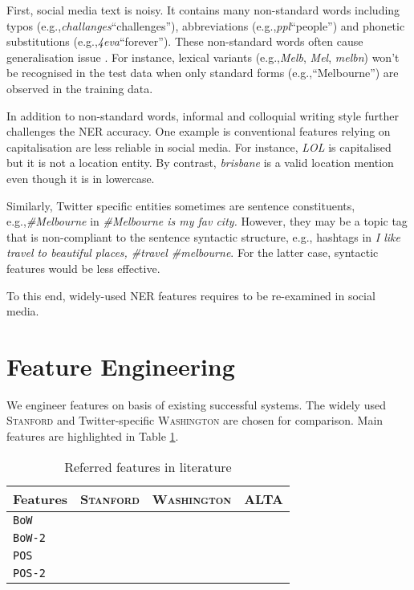 \documentclass[11pt]{article}
\newcommand{\eg}{e.g.,\xspace}
\newcommand{\mygl}[1]{``#1''}
\newcommand{\myex}[1]{\textit{#1}}
\newcommand{\lexpair}[2]{\myex{#1}\xspace\mygl{#2}}
\newcommand{\stanford}{\textsc{Stanford}\xspace}
\newcommand{\washington}{\textsc{Washington}\xspace}
\newcommand{\alta}{\textsc{ALTA}\xspace}
\newcommand{\feature}[1]{\texttt{#1}\xspace}
\newcommand{\tabref}[2][]{Table#1 \ref{#2}}
\newcommand{\cmark}{\ding{51}}%
\begin{document}
First, social media text is noisy.
It contains many non-standard words including typos (\eg \lexpair{challanges}{challenges}), abbreviations (\eg \lexpair{ppl}{people}) and phonetic substitutions (\eg \lexpair{4eva}{forever}).
These non-standard words often cause generalisation issue \cite{acl11han}.
For instance, lexical variants (\eg \myex{Melb}, \myex{Mel}, \myex{melbn}) won't be recognised in the test data when only standard forms (\eg \mygl{Melbourne}) are observed in the training data.

In addition to non-standard words, informal and colloquial writing style further challenges the NER accuracy.
One example is conventional features relying on capitalisation are less reliable in social media.
For instance, \myex{LOL} is capitalised but it is not a location entity.
By contrast, \myex{brisbane} is a valid location mention even though it is in lowercase.

Similarly, Twitter specific entities sometimes are sentence constituents, \eg \myex{\#Melbourne} in \myex{\#Melbourne is my fav city.}
However, they may be a topic tag that is non-compliant to the sentence syntactic structure, \eg hashtags in \myex{I like travel to beautiful places, \#travel \#melbourne}.
For the latter case, syntactic features would be less effective.

To this end, widely-used NER features requires to be re-examined in social media.

\section{Feature Engineering}
\label{sec:feature}
We engineer features on basis of existing successful systems.
The widely used \stanford and Twitter-specific \washington are chosen for comparison.
Main features are highlighted in \tabref{tab:fea_comp}.

\begin{table}[h]
\begin{center}
\begin{tabular}{lccc}
\hline 
Features & \stanford & \washington & \alta \\ 
\hline
\feature{BoW} & \cmark & & \\
\feature{BoW-2} & & & \\
\feature{POS} & & & \\
\feature{POS-2} & & & \\
\hline
\end{tabular}
\end{center}
\caption{Referred features in literature}
\label{tab:fea_comp}
\end{table}
\end{document}

